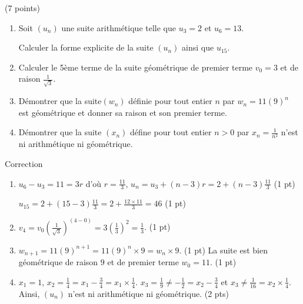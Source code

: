 \documentclass[a4paper,11pt]{article}
\theoremstyle{break}
\begin{document}
   \begin{exo}(7 points)
   ~
      \vspace{0.25cm}
   
  
  \begin{enumerate}
   \item Soit $(u_n)$ une suite arithmétique telle que $u_3=2$ et $u_6=13$.
   
   Calculer la forme explicite de la suite $(u_n)$ ainsi que $u_{15}$. 
   
   \item Calculer le 5ème terme de la suite géométrique de premier terme $v_0=3$ et de raison 
   $\frac{1}{\sqrt 3}$.
   
   \item Démontrer que la suite$(w_n)$ définie pour tout entier $n$ par $w_n=11(9)^n$ est géométrique
   et donner sa raison et son premier terme.
   
   \item Démontrer que la suite $(x_n)$ défine pour tout entier $n>0$ par $x_n=\frac{1}{n^2}$ n'est ni
   arithmétique ni géométrique. 
  \end{enumerate}

\begin{correction}

Correction
\begin{enumerate}
 \item $u_6-u_3=11=3r$ d'o\`u $r=\frac{11}{3}$, $u_n=u_3+(n-3)r=2+(n-3)\frac{11}{3}$ (1 pt)
 
 $u_{15}=2+(15-3)\frac{11}{3}=2+\frac{12 \times 11}{3}=46$ (1 pt)
 \item $v_{4}=v_0(\frac{1}{\sqrt{3}})^{(4-0)}=3(\frac{1}{3})^2=\frac{1}{3}$. (1 pt)
 \item $w_{n+1}=11(9)^{n+1}=11(9)^n\times 9=w_n \times 9$. (1 pt)
 La suite est bien g\'eom\'etrique de raison $9$ 
 et de premier terme $w_0=11$. (1 pt)
 \item $x_1=1$, $x_2=\frac{1}{4}=x_1-\frac{3}{4}=x_1 \times \frac{1}{4}$. 
 $x_3=\frac{1}{9} \neq -\frac{1}{2}=x_2-\frac{3}{4}$ et $x_3 \neq \frac{1}{16} = x_2 \times \frac{1}{4}$.
 Ainsi, $(u_n)$ n'est ni arithm\'etique ni 
 g\'eom\'etrique. (2 pts)
\end{enumerate}

\end{correction}
  \end{exo}
    
\end{document}
